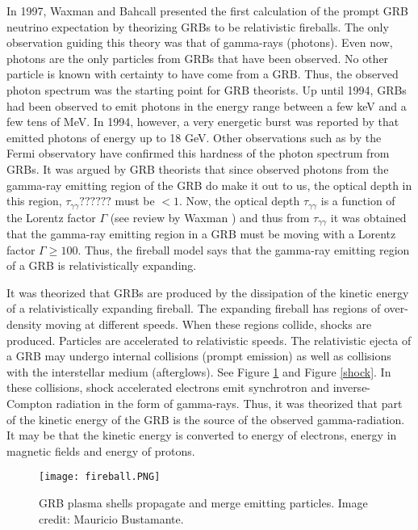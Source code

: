 \documentclass[12pt]{article}
\begin{document}
\begin{doublespace}
In 1997, Waxman and Bahcall presented the first calculation of the prompt GRB neutrino expectation \cite{firstcalc} by theorizing GRBs to be relativistic fireballs. The only observation guiding this theory was that of gamma-rays (photons). Even now, photons are the only particles from GRBs that have been observed. No other particle is known with certainty to have come from a GRB. Thus, the observed photon spectrum was the starting point for GRB theorists. Up until 1994, GRBs had been observed to emit photons in the energy range between a few keV and a few tens of MeV. In 1994, however, a very energetic burst was reported by \cite{longhardgrb} that emitted photons of energy up to 18 GeV. Other observations such as by the Fermi observatory \cite{fermishorthardgrb} have confirmed this hardness of the photon spectrum from GRBs. It was argued by GRB theorists that since observed photons from the gamma-ray emitting region of the GRB do make it out to us, the optical depth in this region, $\tau_{\gamma \gamma}??????$ must be $< 1$. Now, the optical depth $\tau_{\gamma \gamma}$ is a function of the Lorentz factor $\Gamma$ (see review by Waxman \cite{Waxmanreview}) and thus from $\tau_{\gamma \gamma}$ it was obtained that the gamma-ray emitting region in a GRB must be moving with a Lorentz factor $\Gamma \geq 100$. Thus, the fireball model says that the gamma-ray emitting region of a GRB is relativistically expanding. \par
It was theorized that GRBs are produced by the dissipation of the kinetic energy of a relativistically expanding fireball. The expanding fireball has regions of over-density moving at different speeds. When these regions collide, shocks are produced. Particles are accelerated to relativistic speeds. The relativistic ejecta of a GRB may undergo internal collisions (prompt emission) as well as collisions with the interstellar medium (afterglows). See Figure \ref{fireball} and Figure \ref{shock}. In these collisions, shock accelerated electrons emit synchrotron and inverse-Compton radiation in the form of gamma-rays. Thus, it was theorized that part of the kinetic energy of the GRB is the source of the observed gamma-radiation. It may be that the kinetic energy is converted to energy of electrons, energy in magnetic fields and energy of protons. \par
\begin{figure}[h]
\centering
\texttt{[image: fireball.PNG]}
\caption{GRB plasma shells propagate and merge emitting particles. Image credit: Mauricio Bustamante.}
\label{fireball}
\end{figure}


\end{doublespace}
\end{document}
